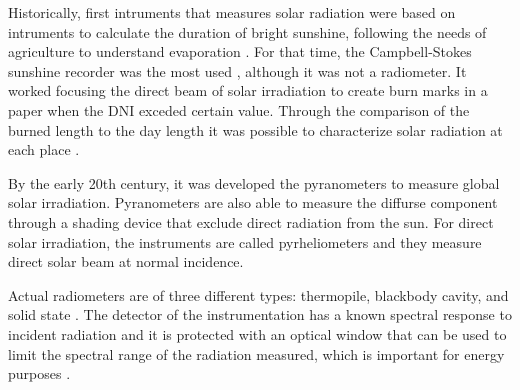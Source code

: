 Historically, first intruments that measures solar radiation were based on intruments to calculate the duration of bright sunshine, following the needs of agriculture to understand evaporation \cite*{sengupta2017best}. For that time, the Campbell-Stokes sunshine recorder was the most used \cite*{sengupta2017best}, although it was not a radiometer. It worked focusing the direct beam of solar irradiation to create burn marks in a paper when the DNI exceded certain value. Through the comparison of the burned length to the day length it was possible to characterize solar radiation at each place \cite*{Iqbal2012Introduction}.

By the early 20th century, it was developed the pyranometers to measure global solar irradiation. Pyranometers are also able to measure the diffurse component through a shading device that exclude direct radiation from the sun. For direct solar irradiation, the instruments are called pyrheliometers and they measure direct solar beam at normal incidence.
 
Actual radiometers are of three different types: thermopile, blackbody cavity, and solid state \cite*{Gueymard2008}. The detector of the instrumentation has a known spectral response to incident radiation and it is protected with an optical window that can be used to limit the spectral range of the radiation measured, which is important for energy purposes \cite*{Gueymard2008}. 


